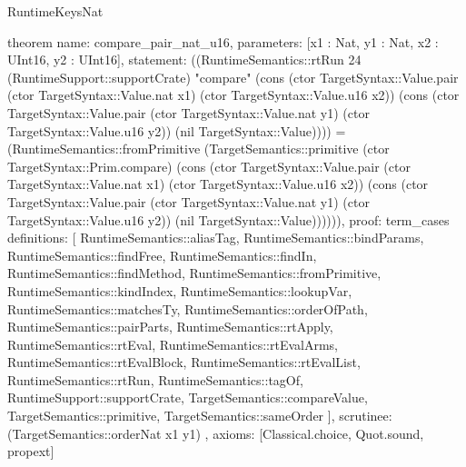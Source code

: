 \begin{lexlean}{RuntimeKeysNat}
\begin{semanticmodule}
theorem{
  name: compare_pair_nat_u16,
  parameters: [x1 : Nat, y1 : Nat, x2 : UInt16, y2 : UInt16],
  statement: ((RuntimeSemantics::rtRun 24 (RuntimeSupport::supportCrate) "compare" (cons (ctor TargetSyntax::Value.pair (ctor TargetSyntax::Value.nat x1) (ctor TargetSyntax::Value.u16 x2)) (cons (ctor TargetSyntax::Value.pair (ctor TargetSyntax::Value.nat y1) (ctor TargetSyntax::Value.u16 y2)) (nil TargetSyntax::Value)))) = (RuntimeSemantics::fromPrimitive (TargetSemantics::primitive (ctor TargetSyntax::Prim.compare) (cons (ctor TargetSyntax::Value.pair (ctor TargetSyntax::Value.nat x1) (ctor TargetSyntax::Value.u16 x2)) (cons (ctor TargetSyntax::Value.pair (ctor TargetSyntax::Value.nat y1) (ctor TargetSyntax::Value.u16 y2)) (nil TargetSyntax::Value)))))),
  proof: term_cases{
    definitions: [
      RuntimeSemantics::aliasTag,
      RuntimeSemantics::bindParams,
      RuntimeSemantics::findFree,
      RuntimeSemantics::findIn,
      RuntimeSemantics::findMethod,
      RuntimeSemantics::fromPrimitive,
      RuntimeSemantics::kindIndex,
      RuntimeSemantics::lookupVar,
      RuntimeSemantics::matchesTy,
      RuntimeSemantics::orderOfPath,
      RuntimeSemantics::pairParts,
      RuntimeSemantics::rtApply,
      RuntimeSemantics::rtEval,
      RuntimeSemantics::rtEvalArms,
      RuntimeSemantics::rtEvalBlock,
      RuntimeSemantics::rtEvalList,
      RuntimeSemantics::rtRun,
      RuntimeSemantics::tagOf,
      RuntimeSupport::supportCrate,
      TargetSemantics::compareValue,
      TargetSemantics::primitive,
      TargetSemantics::sameOrder
    ],
    scrutinee: (TargetSemantics::orderNat x1 y1)
  },
  axioms: [Classical.choice, Quot.sound, propext]
}


\end{semanticmodule}
\end{lexlean}
